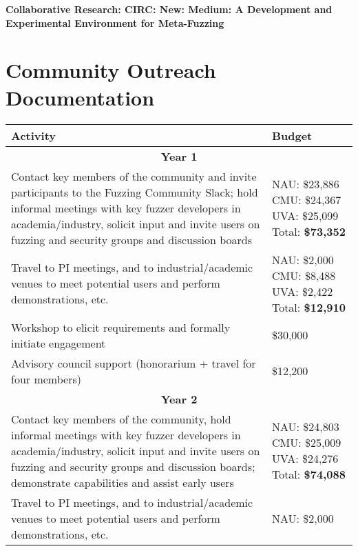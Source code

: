 \documentclass[12pt]{article}
\begin{document}
\begin{center} {\Large\sf\textbf{Collaborative Research: CIRC: New: Medium: A
      Development and Experimental Environment for Meta-Fuzzing}}
\end{center}

\section*{Community Outreach Documentation}


\begin{table}
  \begin{tabular}{|p{12cm}|p{3cm}|}
    \hline
    {\bf Activity} & {\bf Budget} \\
    \hline 
    \multicolumn{2}{c}{{\bf Year 1}} \\
    \hline
    Contact key members of the community and invite participants to the
    Fuzzing Community Slack; hold informal meetings with
    key fuzzer developers in academia/industry, solicit input and
    invite users
    on fuzzing and security groups and discussion boards &  NAU: \$23,886 CMU: \$24,367  UVA: \$25,099
                                                      Total: \textbf{\$73,352} \\
    \hline
    Travel to PI meetings, and to industrial/academic venues to meet
    potential users and perform demonstrations, etc. & NAU: \$2,000
                                                       CMU: \$8,488 UVA:
                                                       \$2,422 Total: \textbf{\$12,910}\\
    \hline
    Workshop to elicit requirements and formally initiate engagement
& \$30,000 \\
    \hline 
    Advisory council support (honorarium + travel for four members) 
  & \$12,200 \\
    \hline
    \hline
    \multicolumn{2}{c}{{\bf Year 2}} \\
    \hline
    \hline
    Contact key members of the community, hold informal meetings with
    key fuzzer developers in academia/industry, solicit input and
    invite users
    on fuzzing and security groups and discussion boards; demonstrate
    capabilities and assist early users&  NAU:  \$24,803 CMU:  \$25,009 UVA: \$24,276
                                                      Total: \textbf{\$74,088}  \\
    \hline
    Travel to PI meetings, and to industrial/academic venues to meet
    potential users and perform demonstrations, etc. & NAU: \$2,000

\end{tabular}
\end{table}
\end{document}
